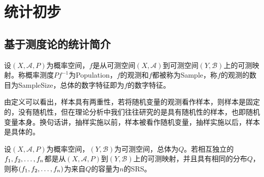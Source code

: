 \chapter{统计初步}

\section{基于测度论的统计简介}
\begin{definition}
	设$(X,\mathscr{A},P)$为概率空间，$f$是从可测空间$(X,\mathscr{A})$到可测空间$(Y,\mathscr{B})$上的可测映射。称概率测度$Pf^{-1}$为\gls{Population}，$f$的观测和$f$都被称为\gls{Sample}，称$f$的观测的数目为\gls{SampleSize}，总体的数字特征即为$f$的数字特征。
\end{definition}
\begin{note}
	由定义可以看出，样本具有两重性，若将随机变量的观测看作样本，则样本是固定的，没有随机性，但在理论分析中我们往往研究的是具有随机性的样本，也即随机变量本身。换句话讲，抽样实施以前，样本被看作随机变量，抽样实施以后，样本是具体的。
\end{note}
\begin{definition}
	设$(X,\mathscr{A},P)$为概率空间，$(Y,\mathscr{B})$为可测空间，总体为$Q$。若相互独立的$f_1, f_2, \dots, f_{n}$都是从$(X,\mathscr{A},P)$到$(Y,\mathscr{B})$上的可测映射，并且具有相同的分布$Q$，则称$(f_1, f_2, \dots, f_{n})$为来自$Q$的容量为$n$的\gls{SRS}。
\end{definition}
